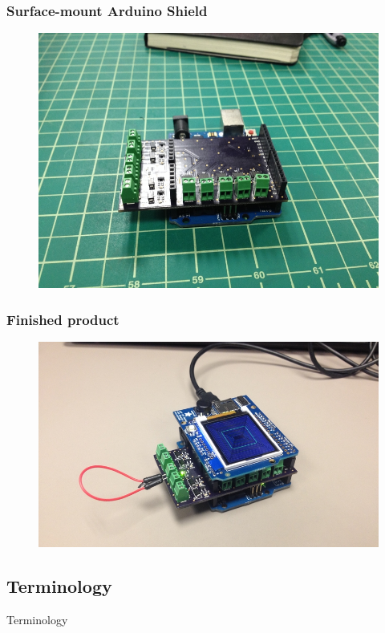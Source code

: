 \documentclass{beamer}
\begin{document}
\begin{frame}
\frametitle{Surface-mount Arduino Shield}
\begin{figure}
\includegraphics[width=0.9\linewidth]{ovenboard3-side.png}
\end{figure}
\end{frame}
\begin{frame}
\frametitle{Finished product}
\begin{figure}
\includegraphics[width=0.9\linewidth]{ovenboard3-final.png}
\end{figure}
\end{frame}


\subsection{Terminology}

\begin{frame}
\Huge{\centerline{Terminology}}
\end{frame}
\end{document}
